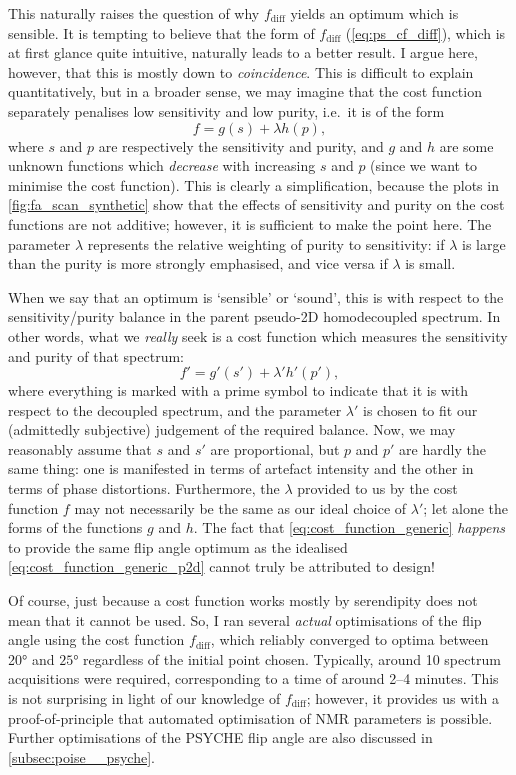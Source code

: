 This naturally raises the question of why $f_\text{diff}$ yields an optimum which is sensible.
It is tempting to believe that the form of $f_\text{diff}$ (\cref{eq:ps_cf_diff}), which is at first glance quite intuitive, naturally leads to a better result.
I argue here, however, that this is mostly down to \textit{coincidence}.
This is difficult to explain quantitatively, but in a broader sense, we may imagine that the cost function separately penalises low sensitivity and low purity, i.e.\ it is of the form
\begin{equation}
    \label{eq:cost_function_generic}
    f = g(s) + \lambda h(p),
\end{equation}
where $s$ and $p$ are respectively the sensitivity and purity, and $g$ and $h$ are some unknown functions which \textit{decrease} with increasing $s$ and $p$ (since we want to minimise the cost function).
This is clearly a simplification, because the plots in \cref{fig:fa_scan_synthetic} show that the effects of sensitivity and purity on the cost functions are not additive; however, it is sufficient to make the point here.
The parameter $\lambda$ represents the relative weighting of purity to sensitivity: if $\lambda$ is large than the purity is more strongly emphasised, and vice versa if $\lambda$ is small.

When we say that an optimum is `sensible' or `sound', this is with respect to the sensitivity/purity balance in the parent pseudo-2D homodecoupled spectrum.
In other words, what we \textit{really} seek is a cost function which measures the sensitivity and purity of that spectrum:
\begin{equation}
    \label{eq:cost_function_generic_p2d}
    f' = g'(s') + \lambda' h'(p'),
\end{equation}
where everything is marked with a prime symbol to indicate that it is with respect to the decoupled spectrum, and the parameter $\lambda'$ is chosen to fit our (admittedly subjective) judgement of the required balance.
Now, we may reasonably assume that $s$ and $s'$ are proportional, but $p$ and $p'$ are hardly the same thing: one is manifested in terms of artefact intensity and the other in terms of phase distortions.
Furthermore, the $\lambda$ provided to us by the cost function $f$ may not necessarily be the same as our ideal choice of $\lambda'$; let alone the forms of the functions $g$ and $h$.
The fact that \cref{eq:cost_function_generic} \textit{happens} to provide the same flip angle optimum as the idealised \cref{eq:cost_function_generic_p2d} cannot truly be attributed to design!

Of course, just because a cost function works mostly by serendipity does not mean that it cannot be used.
    So, I ran several \textit{actual} optimisations of the flip angle using the cost function $f_\text{diff}$, which reliably converged to optima between \ang{20} and $\ang{25}$ regardless of the initial point chosen.
Typically, around 10 spectrum acquisitions were required, corresponding to a time of around 2--4 minutes.
This is not surprising in light of our knowledge of $f_\text{diff}$; however, it provides us with a proof-of-principle that automated optimisation of NMR parameters is possible.
Further optimisations of the PSYCHE flip angle are also discussed in \cref{subsec:poise__psyche}.
